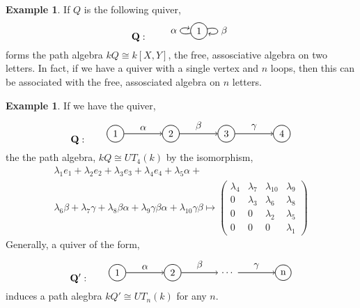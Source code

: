 \documentclass[11.5pt, twoside, a4paper, titlepage]{report}
\providecommand{\equ}[0]{\begin{equation*}}
\providecommand{\eequ}[0] {\end{equation*}}
\theoremstyle{definition}
\newtheorem{eg}[mydef]{Example}
\theoremstyle{plain}
\begin{document}
\begin{eg}
If $Q$ is the following quiver,
\equ
\mathbf{Q}: \qquad
\begin{tikzpicture}[->,-latex, auto, every path/.style={->, semithick}, main node/.style={draw, circle}]
\node	[main node]		(1) at (0,0)		{1};

\draw (1) edge[loop left] node [auto] {$\alpha$} (1);
\draw (1) edge [loop right] node [auto] {$\beta$} (1);
\end{tikzpicture}
\eequ
forms the path algebra $kQ\cong k[X, Y]$, the free, assosciative algebra on two letters. In fact, if we have a quiver with a single vertex and $n$ loops, then this can be associated with the free, assosciated algebra on $n$ letters.
\end{eg}

\begin{eg} \label{UTpathalgebraeg}
If we have the quiver,
\equ
\mathbf{Q}: \qquad
\begin{tikzpicture}[->,-latex, auto, every path/.style={->, semithick}, main node/.style={draw, circle}]
\node	[main node]		(1) at (0,0)		{1};
\node [main node]		(2) at (2,0)		{2};
\node [main node]		(3) at (4,0)		{3};
\node [main node]		(4) at (6,0)		{4};

\draw (1) edge node [auto] {$\alpha$} (2);
\draw (2) edge node [auto] {$\beta$} (3);
\draw (3) edge node [auto] {$\gamma$} (4);
\end{tikzpicture}
\eequ
the the path algebra, $kQ \cong UT_4(k)$ by the isomorphism,
\begin{multline*}
\lambda_1e_1+\lambda_2e_2+\lambda_3e_3+\lambda_4e_4+\lambda_5\alpha+\\
\lambda_6\beta+\lambda_7\gamma+\lambda_8\beta\alpha+\lambda_9\gamma\beta\alpha+\lambda_{10}\gamma\beta
\mapsto
\begin{pmatrix*}
\lambda_4 & \lambda_7 & \lambda_{10} & \lambda_9 \\
0 & \lambda_3 & \lambda_6 & \lambda_{8}\\
0 & 0 & \lambda_2 & \lambda_5 \\
0 & 0 & 0 & \lambda_1
\end{pmatrix*}
\end{multline*}
Generally, a quiver of the form,
\equ
\mathbf{Q'}: \qquad
\begin{tikzpicture}[->,-latex, auto, every path/.style={->, semithick}, main node/.style={draw, circle}]
\node	[main node]		(1) at (0,0)		{1};
\node [main node]		(2) at (2,0)		{2};
\node []			(3) at (4,0)		{$\dots$};
\node [main node]		(4) at (6,0)		{n};

\draw (1) edge node [auto] {$\alpha$} (2);
\draw (2) edge node [auto] {$\beta$} (3);
\draw (3) edge node [auto] {$\gamma$} (4);
\end{tikzpicture}
\eequ
induces a path alegbra $kQ' \cong UT_n(k)$ for any $n$.
\end{eg}
\end{document}
